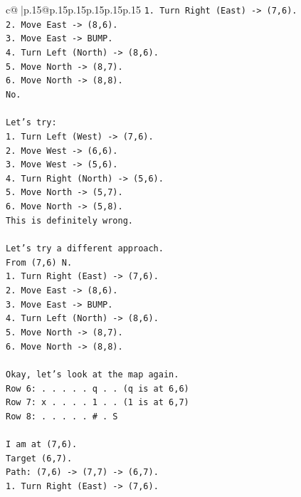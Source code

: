 \documentclass{article}
\begin{document}
{\begin{supertabular}{c@{$\;$}|p{.15\linewidth}@{}p{.15\linewidth}p{.15\linewidth}p{.15\linewidth}p{.15\linewidth}p{.15\linewidth}}
{{{\texttt{1. Turn Right (East) {-}> (7,6).} \\
\texttt{2. Move East {-}> (8,6).} \\
\texttt{3. Move East {-}> BUMP.} \\
\texttt{4. Turn Left (North) {-}> (8,6).} \\
\texttt{5. Move North {-}> (8,7).} \\
\texttt{6. Move North {-}> (8,8).} \\
\texttt{No.} \\
\\ 
\texttt{Let's try:} \\
\texttt{1. Turn Left (West) {-}> (7,6).} \\
\texttt{2. Move West {-}> (6,6).} \\
\texttt{3. Move West {-}> (5,6).} \\
\texttt{4. Turn Right (North) {-}> (5,6).} \\
\texttt{5. Move North {-}> (5,7).} \\
\texttt{6. Move North {-}> (5,8).} \\
\texttt{This is definitely wrong.} \\
\\ 
\texttt{Let's try a different approach.} \\
\texttt{From (7,6) N.} \\
\texttt{1. Turn Right (East) {-}> (7,6).} \\
\texttt{2. Move East {-}> (8,6).} \\
\texttt{3. Move East {-}> BUMP.} \\
\texttt{4. Turn Left (North) {-}> (8,6).} \\
\texttt{5. Move North {-}> (8,7).} \\
\texttt{6. Move North {-}> (8,8).} \\
\\ 
\texttt{Okay, let's look at the map again.} \\
\texttt{Row 6: . . . . . q . . (q is at 6,6)} \\
\texttt{Row 7: x . . . . 1 . . (1 is at 6,7)} \\
\texttt{Row 8: . . . . . \# . S} \\
\\ 
\texttt{I am at (7,6).} \\
\texttt{Target (6,7).} \\
\texttt{Path: (7,6) {-}> (7,7) {-}> (6,7).} \\
\texttt{1. Turn Right (East) {-}> (7,6).} \\
}}}
\end{supertabular}}
\end{document}
